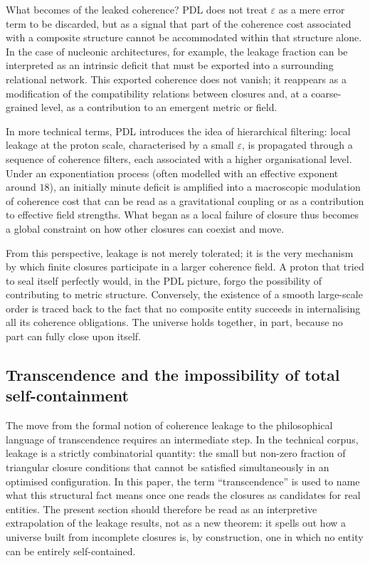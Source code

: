 \documentclass[11pt,a4paper]{article}
\theoremstyle{definition}
\begin{document}
What becomes of the leaked coherence? PDL does not treat \(\varepsilon\) as a mere error term to be discarded, but as a signal that part of the coherence cost associated with a composite structure cannot be accommodated within that structure alone.\cite{Laubscher_Leakage_Probability_2024,Laubscher_UniversalCoherenceLeakage_2024} In the case of nucleonic architectures, for example, the leakage fraction can be interpreted as an intrinsic deficit that must be exported into a surrounding relational network. This exported coherence does not vanish; it reappears as a modification of the compatibility relations between closures and, at a coarse-grained level, as a contribution to an emergent metric or field.

In more technical terms, PDL introduces the idea of hierarchical filtering: local leakage at the proton scale, characterised by a small \(\varepsilon\), is propagated through a sequence of coherence filters, each associated with a higher organisational level.\cite{Laubscher_Exponent18_v2_2024,Laubscher_UniversalCoherenceLeakage_2024} Under an exponentiation process (often modelled with an effective exponent around \(18\)), an initially minute deficit is amplified into a macroscopic modulation of coherence cost that can be read as a gravitational coupling or as a contribution to effective field strengths.\cite{Laubscher_Exponent18_v2_2024,Laubscher_EffectiveFields_2024} What began as a local failure of closure thus becomes a global constraint on how other closures can coexist and move.

From this perspective, leakage is not merely tolerated; it is the very mechanism by which finite closures participate in a larger coherence field. A proton that tried to seal itself perfectly would, in the PDL picture, forgo the possibility of contributing to metric structure. Conversely, the existence of a smooth large-scale order is traced back to the fact that no composite entity succeeds in internalising all its coherence obligations.\cite{Laubscher_UniversalCoherenceLeakage_2024,Laubscher_PDL_Position_2024} The universe holds together, in part, because no part can fully close upon itself.

\subsection{Transcendence and the impossibility of total self-containment}

The move from the formal notion of coherence leakage to the philosophical language of transcendence requires an intermediate step. In the technical corpus, leakage is a strictly combinatorial quantity: the small but non-zero fraction of triangular closure conditions that cannot be satisfied simultaneously in an optimised configuration. In this paper, the term ``transcendence'' is used to name what this structural fact means once one reads the closures as candidates for real entities. The present section should therefore be read as an interpretive extrapolation of the leakage results, not as a new theorem: it spells out how a universe built from incomplete closures is, by construction, one in which no entity can be entirely self-contained.
\end{document}
